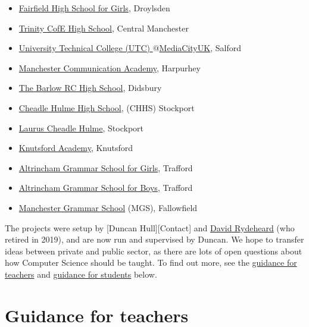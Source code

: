 \documentclass[
  12pt,
]{book}
\providecommand{\tightlist}{%
  \setlength{\itemsep}{0pt}\setlength{\parskip}{0pt}}
\begin{document}
\begin{itemize}
\tightlist
\item
  \href{http://www.fairfieldhigh.tameside.sch.uk/}{Fairfield High School for Girls}, Droylsden
\item
  \href{https://www.trinityhigh.com}{Trinity CofE High School}, Central Manchester
\item
  \href{http://www.utcmediacityuk.org.uk/}{University Technical College (UTC) \(@\)MediaCityUK}, Salford
\item
  \href{https://www.manchestercommunicationacademy.com/}{Manchester Communication Academy}, Harpurhey\\
\item
  \href{https://thebarlowrchigh.co.uk/}{The Barlow RC High School}, Didsbury
\item
  \href{https://www.chhs.org.uk/}{Cheadle Hulme High School}, (CHHS) Stockport
\item
  \href{https://www.lauruscheadlehulme.org.uk/}{Laurus Cheadle Hulme}, Stockport
\item
  \href{https://www.knutsfordacademy.org.uk/}{Knutsford Academy}, Knutsford
\item
  \href{http://www.aggs.trafford.sch.uk/}{Altrincham Grammar School for Girls}, Trafford
\item
  \href{https://www.agsb.co.uk/}{Altrincham Grammar School for Boys}, Trafford
\item
  \href{https://www.mgs.org/}{Manchester Grammar School} (MGS), Fallowfield
\end{itemize}

The projects were setup by {[}Duncan Hull{]}{[}Contact{]} and \href{http://www.cs.man.ac.uk/~david/}{David Rydeheard} (who retired in 2019), and are now run and supervised by Duncan. We hope to transfer ideas between private and public sector, as there are lots of open questions about how Computer Science should be taught. \citep{cse, suemcr, stephenson, fincherpetre} To find out more, see the \protect\hyperlink{guidance-for-teachers}{guidance for teachers} and \protect\hyperlink{guidance-for-students}{guidance for students} below.

\hypertarget{guidance-for-teachers}{%
\section{Guidance for teachers}\label{guidance-for-teachers}}
\end{document}
